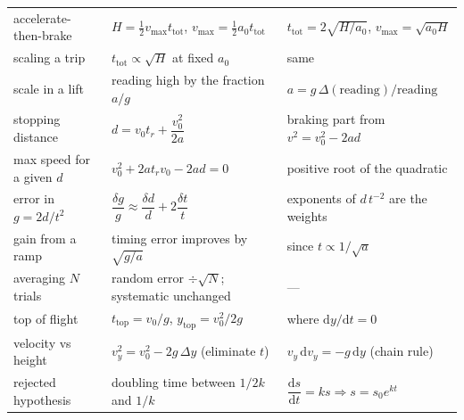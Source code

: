 \documentclass[11pt,twoside,openany]{book}
\newcommand{\dd}{\mathrm{d}}
\begin{document}
\begin{center}
\begin{tabular}{lll}
accelerate-then-brake & $H = \tfrac12 v_{\max}t_{\text{tot}}$, \; $v_{\max} = \tfrac12 a_0 t_{\text{tot}}$ & $t_{\text{tot}} = 2\sqrt{H/a_0}$, \; $v_{\max} = \sqrt{a_0H}$ \\
scaling a trip & $t_{\text{tot}} \propto \sqrt{H}$ at fixed $a_0$ & same \\
scale in a lift & reading high by the fraction $a/g$ & $a = g\,\Delta(\text{reading})/\text{reading}$ \\
stopping distance & $d = v_0 t_r + \dfrac{v_0^{2}}{2a}$ & braking part from $v^2 = v_0^2 - 2ad$ \\
max speed for a given $d$ & $v_0^{2} + 2at_r v_0 - 2ad = 0$ & positive root of the quadratic \\
error in $g = 2d/t^2$ & $\dfrac{\delta g}{g} \approx \dfrac{\delta d}{d} + 2\dfrac{\delta t}{t}$ & exponents of $d\,t^{-2}$ are the weights \\
gain from a ramp & timing error improves by $\sqrt{g/a}$ & since $t \propto 1/\sqrt{a}$ \\
averaging $N$ trials & random error $\div \sqrt{N}$; systematic unchanged & --- \\
top of flight & $t_{\text{top}} = v_0/g$, \quad $y_{\text{top}} = v_0^2/2g$ & where $\dd y/\dd t = 0$ \\
velocity vs height & $v_y^2 = v_0^2 - 2g\,\Delta y$ (eliminate $t$) & $v_y\,\dd v_y = -g\,\dd y$ (chain rule) \\
rejected hypothesis & doubling time between $1/2k$ and $1/k$ & $\dfrac{\dd s}{\dd t} = ks \Rightarrow s = s_0 e^{kt}$ \\
\bottomrule
\end{tabular}
\end{center}
\end{document}
